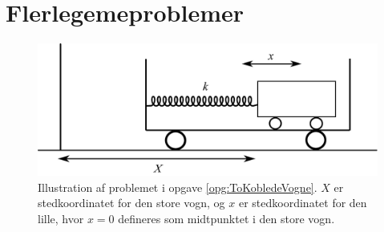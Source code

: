 \section*{Flerlegemeproblemer}
%
%
\begin{figure}[h!]
\centering
\includegraphics[width=\columnwidth]{Analytisk-Mekanik/ToKobledeVogne.pdf}
\caption{Illustration af problemet i opgave \ref{opg:ToKobledeVogne}. $X$ er stedkoordinatet for den store vogn, og $x$ er stedkoordinatet for den lille, hvor $x=0$ defineres som midtpunktet i den store vogn.}
\label{fig:ToKobledeVogne}
\end{figure}
%
%
